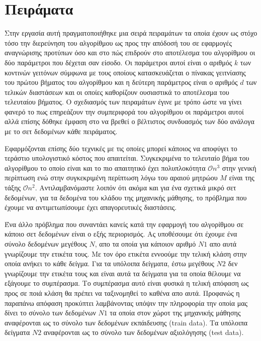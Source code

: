 


\chapter{Πειράματα}
\par
Στην εργασία αυτή πραγματοποιήθηκε μια σειρά πειραμάτων τα οποία έχουν ως στόχο τόσο την διερεύνηση του αλγορίθμου ως προς την απόδοσή του σε εφαρμογές αναγνώρισης προτύπων όσο και στο πώς επιδρούν στο αποτέλεσμα του αλγορίθμου οι δύο παράμετροι που δέχεται σαν είσοδο. Οι παράμετροι αυτοί είναι ο αριθμός $k$ των κοντινών γειτόνων σύμφωνα με τους οποίους κατασκευάζεται ο πίνακας γειτνίασης του πρώτου βήματος του αλγορίθμου και η δεύτερη παράμετρος είναι ο αριθμός $d$ των τελικών διαστάσεων και οι οποίες καθορίζουν ουσιαστικά το αποτέλεσμα του τελευταίου βήματος. Ο σχεδιασμός των πειραμάτων έγινε με τρόπο ώστε να γίνει φανερό το πως επηρεάζουν την συμπεριφορά του αλγορίθμου οι παράμετροι αυτοί αλλά επίσης δόθηκε έμφαση στο να βρεθεί ο βέλτιστος συνδυασμός των δύο ανάλογα με το σετ δεδομένων κάθε πειράματος. 
\par
Eφαρμόζονται επίσης δύο τεχνικές με τις οποίες μπορεί κάποιος να αποφύγει το τεράστιο υπολογιστικό κόστος που απαιτείται. Συγκεκριμένα το τελευταίο βήμα του αλγορίθμου το οποίο είναι και το πιο απαιτητικό έχει πολυπλοκότητα $\mathcal{O}n^{3}$ στην γενική περίπτωση ενώ στην συγκεκριμένη περίπτωση λόγω του αραιού μητρώου $M$ είναι της τάξης $\mathcal{O}n^{2}$. Αντιλαμβανόμαστε λοιπόν ότι ακόμα και για ένα σχετικά μικρό σετ δεδομένων, για τα δεδομένα του κλάδου της μηχανικής μάθησης, το πρόβλημα που έχουμε να αντιμετωπίσουμε έχει απαγορευτικές διαστάσεις. 
\par
Ένα άλλο πρόβλημα που συναντάει κανείς κατά την εφαρμογή του αλγορίθμου σε κάποιο σετ δεδομένων είναι ο εξής περιορισμός. Ας υποθέσουμε ότι έχουμε ένα σύνολο δεδομένων μεγέθους $N$, απο τα οποία για κάποιον αριθμό $N1$ απο αυτά γνωρίζουμε την ετικέτα τους. Με τον όρο ετικέτα εννοούμε την τελική κλάση στην οποία ανήκει το κάθε δείγμα. Για τα υπόλοιπα δείγματα, έστω μεγέθους $N2$ δεν γνωρίζουμε την ετικέτα τους και είναι αυτά τα δείγματα για τα οποία θέλουμε να εξάγουμε το συμπέρασμα. Το συμπέρασμα αυτό είναι φυσικά η τελική απόφαση ως προς σε ποιά κλάση θα πρέπει να ταξινομηθεί το καθένα απο αυτά. Προφανώς η παραπάνω απόφαση προκύπτει λαμβάνοντας υπόψιν την πληροφορία την οποία μας δίνει το σύνολο των δεδομένων $N1$ τα οποία στον χώροτ της μηχανικής μάθησης αναφέρονται ως το σύνολο των δεδομένων εκπάιδευσης \textlatin{(train data)}. Τα υπόλοιπα δείγματα $N2$ αναφέρονται ως το σύνολο των δεδομένων αξιολόγησης \textlatin{(test data)}.
